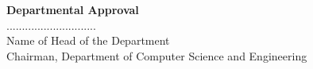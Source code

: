 \begin{titlepage}
\begin{center}
\vspace*{1.0cm}
\noindent \large \textbf{Departmental Approval} \\[15pt]
............................. \\ [-5pt]
Name of Head of the Department \\ [-5pt]
Chairman, Department of Computer Science and Engineering \\ [-5pt]
%
\vspace*{1.5cm}
\\
\\[-15pt]


%
\end{center}
\end{titlepage}
\sloppy
%
\titlepage
%
